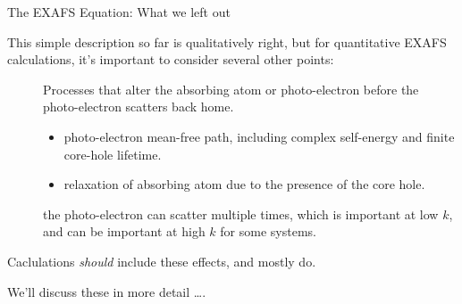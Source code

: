 \begin{slide}{The EXAFS Equation: What we left out}

    \vmm
    \begin{cenpage}{125mm}
      
    This simple description so far is qualitatively right, but for quantitative
    EXAFS calculations, it's important to consider several other points:

    \vspace{2mm}

    \begin{minipage}{102mm}
    \begin{description}
    \item[]  Processes that alter the absorbing
      atom or photo-electron before the photo-electron scatters back home.
      \begin{itemize}
      \item[\BlueEmph{Extrinsic Losses}] photo-electron mean-free path,
        including complex self-energy and finite core-hole lifetime.
      \item[\BlueEmph{Intrinsic Losses}] relaxation of absorbing atom due to
        the  presence of the core hole.
      \end{itemize}

    \item[] the photo-electron can scatter
      multiple times, which is important at low $k$, and can be important
      at high $k$ for some systems.

    \end{description}
    \end{minipage}

    \pause


    \vspace{3mm}
    Caclulations {\emph{should}} include these effects, and mostly do.


    \vspace{3mm}
    We'll discuss these in more detail \ldots.
\vfill

\end{cenpage}

\vfill
\end{slide}

